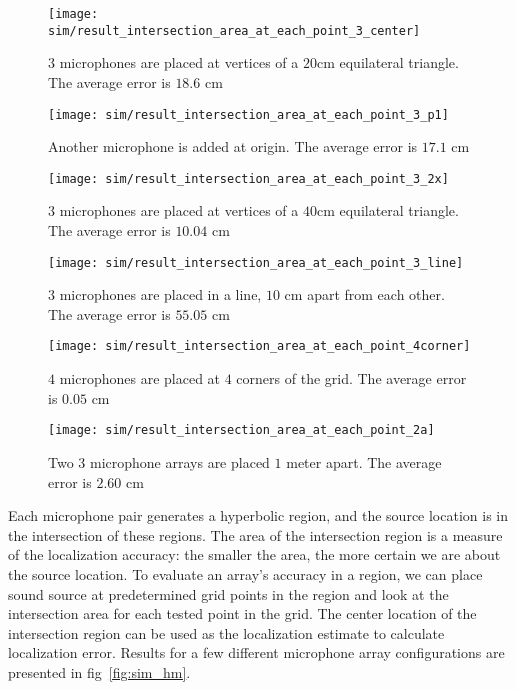 \begin{figure*}[]
  \centering
  \begin{subfigure}[]{.3\textwidth}
    \texttt{[image: sim/result\_intersection\_area\_at\_each\_point\_3\_center]}
    \caption{$3$ microphones are placed at vertices of a $20$cm equilateral triangle. The average error is $18.6$ cm}
    \label{fig:sim_hm_3}
  \end{subfigure}
  \begin{subfigure}[]{.3\textwidth}
    \texttt{[image: sim/result\_intersection\_area\_at\_each\_point\_3\_p1]}
    \caption{Another microphone is added at origin. The average error is $17.1$ cm}
    \label{fig:sim_hm_3_p1}
  \end{subfigure}
  \begin{subfigure}[]{.3\textwidth}
    \texttt{[image: sim/result\_intersection\_area\_at\_each\_point\_3\_2x]}
    \caption{$3$ microphones are placed at vertices of a $40$cm equilateral triangle. The average error is $10.04$ cm}
    \label{fig:sim_hm_3_2x}
  \end{subfigure}
  \begin{subfigure}[]{.3\textwidth}
    \texttt{[image: sim/result\_intersection\_area\_at\_each\_point\_3\_line]}
    \caption{$3$ microphones are placed in a line, $10$ cm apart from each other. The average error is $55.05$ cm}
    \label{fig:sim_hm_3_line}
  \end{subfigure}
  \begin{subfigure}[]{.3\textwidth}
    \texttt{[image: sim/result\_intersection\_area\_at\_each\_point\_4corner]}
    \caption{$4$ microphones are placed at $4$ corners of the grid. The average error is $0.05$ cm}
    \label{fig:sim_hm_4}
  \end{subfigure}
  \begin{subfigure}[]{.3\textwidth}
    \texttt{[image: sim/result\_intersection\_area\_at\_each\_point\_2a]}
    \caption{Two $3$ microphone arrays are placed $1$ meter apart. The average error is $2.60$ cm}
    \label{fig:sim_hm_2_array}
  \end{subfigure}
  \caption{Error heatmap for different array configurations}
  \label{fig:sim_hm}
\end{figure*}

Each microphone pair generates a hyperbolic region, and the source location is in the intersection of these regions. The area of the intersection region is a measure of the localization accuracy: the smaller the area, the more certain we are about the source location. To evaluate an array's accuracy in a region, we can place sound source at predetermined grid points in the region and look at the intersection area for each tested point in the grid. The center location of the intersection region can be used as the localization estimate to calculate localization error. Results for a few different microphone array configurations are presented in fig~\ref{fig:sim_hm}.

